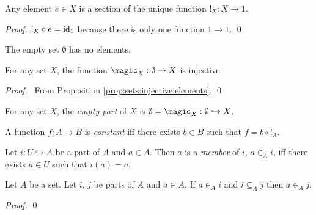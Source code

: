 \begin{prop}
  Any element $e \in X$ is a section of the unique function $!_X : X \rightarrow 1$.
\end{prop}

\begin{proof}
  \pf
  $!_X \circ e = \mathrm{id}_{1}$ because there is only one function $1 \rightarrow 1$.
  \qed
\end{proof}

\begin{ax}
 The empty set $\emptyset$ has no elements.
\end{ax}

\begin{prop}
  For any set $X$, the function $\magic_X : \emptyset \rightarrow X$ is injective.
\end{prop}

\begin{proof}
  \pf\ From Proposition \ref{prop:sets:injective:elements}. \qed
\end{proof}

\begin{df}
  For any set $X$, the \emph{empty part} of $X$ is $\emptyset = \magic_X : \emptyset \hookrightarrow X$.
\end{df}

  \begin{df}
  A function $f : A \rightarrow B$ is \emph{constant} iff there exists $b \in
  B$ such that $f = b \circ !_A$.
\end{df}

\begin{df}[Membership]
 Let $i : U \hookrightarrow A$ be a part of $A$ and $a \in A$. Then $a$ is a
 \emph{member} of $i$, $a \in_A i$, iff there exists $\overline{a} \in U$ such that $i(\overline{a}) = a$.
\end{df}

\begin{prop}
 Let $A$ be a set. Let $i$, $j$ be parts of $A$ and $a \in A$. If $a \in_A i$
 and $i \subseteq_A j$ then $a \in_A j$.
\end{prop}

\begin{proof}
 \pf
 \qed
\end{proof}

